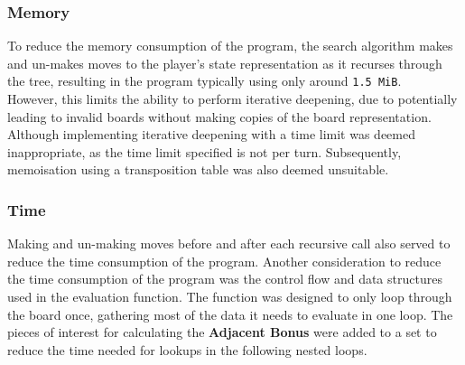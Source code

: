 \documentclass[a4paper,10pt,draft]{article}
\begin{document}
\subsubsection{Memory}
To reduce the memory consumption of the program, the search algorithm makes and un-makes moves to the player's state representation as it recurses through the tree, resulting in the program typically using only around \texttt{1.5 MiB}.\\
However, this limits the ability to perform iterative deepening, due to potentially leading to invalid boards without making copies of the board representation. Although implementing iterative deepening with a time limit was deemed inappropriate, as the time limit specified is not per turn. Subsequently, memoisation using a transposition table was also deemed unsuitable.
\subsubsection{Time}
Making and un-making moves before and after each recursive call also served to reduce the time consumption of the program. Another consideration to reduce the time consumption of the program was the control flow and data structures used in the evaluation function. The function was designed to only loop through the board once, gathering most of the data it needs to evaluate in one loop. The pieces of interest for calculating the \textbf{Adjacent Bonus} were added to a set to reduce the time needed for lookups in the following nested loops.


{}

\end{document}
